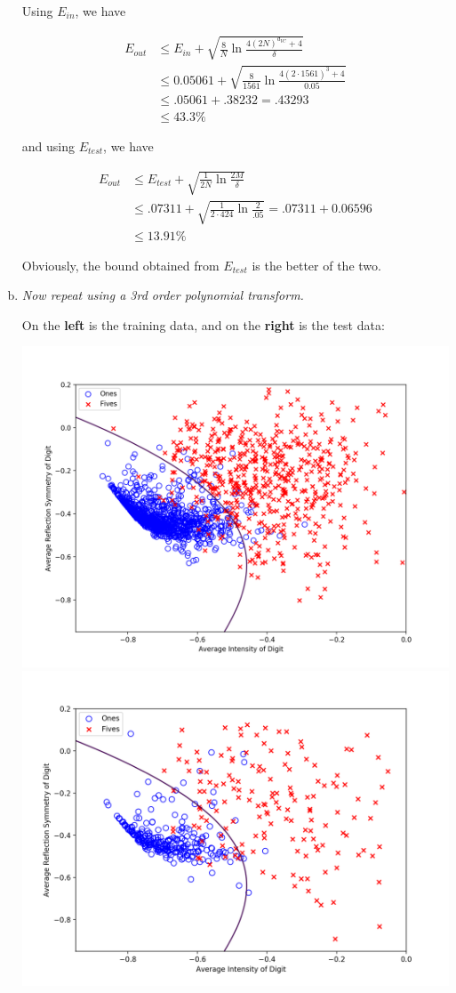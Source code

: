 \documentclass{article}
\begin{document}
\begin{enumerate}[(a)]
    Using $E_{in}$, we have

    \begin{align*}
      E_{out} &\leq E_{in} + \sqrt{\frac{8}{N}\ln\frac{4(2N)^{d_{VC}} + 4}{\delta}} \\
      &\leq 0.05061 + \sqrt{\frac{8}{1561}\ln\frac{4(2\cdot1561)^{3} + 4}{0.05}} \\
      &\leq .05061 + .38232 = .43293 \\
      &\leq 43.3\%
    \end{align*}

    and using $E_{test}$, we have
    
    \begin{align*}
      E_{out} &\leq E_{test} + \sqrt{\frac{1}{2N}\ln\frac{2M}{\delta}} \\
      &\leq .07311 + \sqrt{\frac{1}{2\cdot424}\ln\frac{2}{.05}} = .07311 + 0.06596\\
      &\leq 13.91\%
    \end{align*}

    Obviously, the bound obtained from $E_{test}$ is the better of the two.

  \item \textit{Now repeat using a 3rd order polynomial transform.}
    
    On the \textbf{left} is the training data, and on the \textbf{right} is the test data:

    \begin{center}
      \includegraphics[width=.45\textwidth]{3rdtrans.png}
      \includegraphics[width=.45\textwidth]{3rdEtest.png}
    \end{center}


\end{enumerate}
\end{document}
